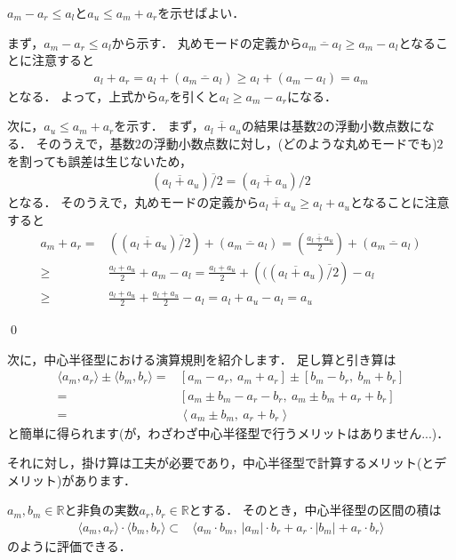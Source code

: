 \begin{Proof}
	$a_m - a_r \le a_l$と$a_u \le a_m + a_r$を示せばよい．

	まず，$a_m - a_r \le a_l$から示す．
	丸めモードの定義から$a_m ~ \overline{-} ~ a_l \ge a_m - a_l$となることに注意すると
	\begin{align*}
		a_l + a_r =a_l + (  a_m ~ \overline{-} ~ a_l ) \ge a_l + (  a_m - a_l ) = a_m
	\end{align*}
	となる．
	よって，上式から$a_r$を引くと$a_l \ge a_m - a_r$になる．

	次に，$a_u \le a_m + a_r$を示す．
	まず，$a_l ~ \overline{+} ~ a_u$の結果は基数$2$の浮動小数点数になる．
	そのうえで，基数$2$の浮動小数点数に対し，(どのような丸めモードでも)$2$を割っても誤差は生じないため，
	\begin{align*}
		(a_l ~ \overline{+} ~ a_u) \overline{/} 2 = (a_l ~ \overline{+} ~ a_u)/2
	\end{align*}
	となる．
	そのうえで，丸めモードの定義から$a_l ~ \overline{+} ~ a_u \ge a_l + a_u$となることに注意すると
	\begin{align*}
		a_m + a_r =& ( (a_l ~ \overline{+} ~ a_u) \overline{/} 2 ) + (a_m ~ \overline{-} ~ a_l) = \left( \frac{a_l ~ \overline{+} ~ a_u}{2} \right) + (a_m ~ \overline{-} ~ a_l) \\
		\ge& \frac{a_l + a_u}{2} + a_m - a_l = \frac{a_l + a_u}{2}  + \left( ( (a_l ~ \overline{+} ~ a_u) \overline{/} 2 \right) - a_l \\
		\ge& \frac{a_l + a_u}{2}  +  \frac{a_l + a_u}{2} - a_l = a_l + a_u - a_l = a_u
	\end{align*}

\qed
\end{Proof}

次に，中心半径型における演算規則を紹介します．
足し算と引き算は
\begin{align*}
	\langle a_m, a_r  \rangle \pm \langle b_m, b_r  \rangle =& [ a_m - a_r, ~ a_m + a_r ] \pm [ b_m - b_r, ~ b_m + b_r ] \\
	=& [a_m \pm b_m - a_r - b_r, ~ a_m \pm b_m + a_r + b_r] \\
	=&  \left\langle a_m \pm b_m, ~ a_r + b_r  \right\rangle
\end{align*}
と簡単に得られます(が，わざわざ中心半径型で行うメリットはありません...)．

それに対し，掛け算は工夫が必要であり，中心半径型で計算するメリット(とデメリット)があります．

\begin{Thm}[中心半径型の区間の積] \label{thm:midrad_mul}
	$a_m,  b_m \in {\mathbb R}$と非負の実数$a_r, b_r \in {\mathbb R}$とする．	  
	そのとき，中心半径型の区間の積は
	\begin{align*}
		\langle a_m, a_r \rangle \cdot \langle b_m, b_r \rangle \subset& \langle a_m \cdot b_m, ~ | a_m | \cdot b_r + a_r \cdot | b_m | + a_r \cdot b_r \rangle
	\end{align*}
	のように評価できる．
\end{Thm}

